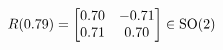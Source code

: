 \documentclass[preview]{standalone}
\begin{document}
\begin{align*}
\special{dvisvgm:raw <g id='unique000'>}R(0.79) = \begin{bmatrix} 0.70 & -0.71 \\ 0.71 & 0.70 \end{bmatrix} \in \text{SO}(2)\special{dvisvgm:raw </g>}
\end{align*}
\end{document}
